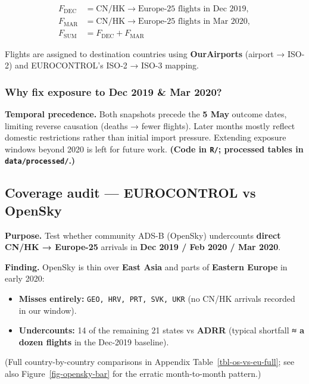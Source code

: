 \documentclass[
  authoryear,
  preprint,
  3p,
  onecolumn]{elsarticle}
\providecommand{\tightlist}{%
  \setlength{\itemsep}{0pt}\setlength{\parskip}{0pt}}\usepackage{longtable,booktabs,array}
\begin{document}
\[
\begin{aligned}
F_{\text{DEC}} &= \text{CN/HK}\rightarrow\text{Europe-25 flights in Dec 2019}, \\
F_{\text{MAR}} &= \text{CN/HK}\rightarrow\text{Europe-25 flights in Mar 2020}, \\
F_{\text{SUM}} &= F_{\text{DEC}} + F_{\text{MAR}}
\end{aligned}
\]

Flights are assigned to destination countries using \textbf{OurAirports}
(airport → ISO-2) and EUROCONTROL's ISO-2 → ISO-3 mapping.

\subsubsection{Why fix exposure to Dec 2019 \& Mar
2020?}\label{why-fix-exposure-to-dec-2019-mar-2020}

\textbf{Temporal precedence.} Both snapshots precede the \textbf{5 May}
outcome dates, limiting reverse causation (deaths → fewer flights).
Later months mostly reflect domestic restrictions rather than initial
import pressure. Extending exposure windows beyond 2020 is left for
future work. \textbf{(Code in \texttt{R/}; processed tables in
\texttt{data/processed/}.)}

\subsection{Coverage audit --- EUROCONTROL vs
OpenSky}\label{coverage-audit}

\textbf{Purpose.} Test whether community ADS-B (OpenSky) undercounts
\textbf{direct CN/HK → Europe-25} arrivals in \textbf{Dec 2019 / Feb
2020 / Mar 2020}.

\textbf{Finding.} OpenSky is thin over \textbf{East Asia} and parts of
\textbf{Eastern Europe} in early 2020:

\begin{itemize}
\tightlist
\item
  \textbf{Misses entirely:} \texttt{GEO,\ HRV,\ PRT,\ SVK,\ UKR} (no
  CN/HK arrivals recorded in our window).
\item
  \textbf{Undercounts:} 14 of the remaining 21 states vs \textbf{ADRR}
  (typical shortfall \textbf{≈ a dozen flights} in the Dec-2019
  baseline).
\end{itemize}

(Full country-by-country comparisons in Appendix
Table~\ref{tbl-os-vs-eu-full}; see also Figure~\ref{fig-opensky-bar} for
the erratic month-to-month pattern.)
\end{document}
